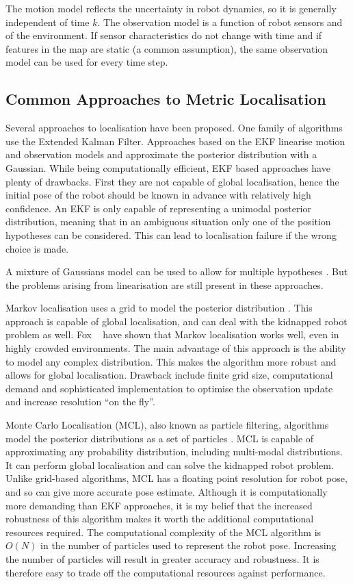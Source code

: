 The motion model reflects the uncertainty in robot dynamics, so it is
generally independent of time $k$. The observation model is a function
of robot sensors and of the environment. If sensor characteristics do
not change with time and if features in the map are static (a common
assumption), the same observation model can be used for every time
step.

\subsection{Common Approaches to Metric Localisation}

Several approaches to localisation have been proposed. One family of
algorithms use the Extended Kalman Filter\cite{Jensfelt99}. Approaches
based on the EKF linearise motion and observation models and
approximate the posterior distribution with a Gaussian. While being
computationally efficient, EKF based approaches have plenty of
drawbacks. First they are not capable of global localisation, hence
the initial pose of the robot should be known in advance with
relatively high confidence. An EKF is only capable of representing a
unimodal posterior distribution, meaning that in an ambiguous
situation only one of the position hypotheses can be considered. This
can lead to localisation failure if the wrong choice is made.

A mixture of Gaussians model can be used to allow for multiple
hypotheses \cite{JensfeltKristensen01,Cox94}. But the problems arising
from linearisation are still present in these approaches.

Markov localisation uses a grid to model the posterior distribution
\cite{Fox99}. This approach is capable of global localisation, and can
deal with the kidnapped robot problem as well. Fox \etal\ \cite{fb99}
have shown that Markov localisation works well, even in highly crowded
environments. The main advantage of this approach is the ability to
model any complex distribution. This makes the algorithm more robust
and allows for global localisation. Drawback include finite grid size,
computational demand and sophisticated implementation to optimise the
observation update and increase resolution ``on the fly''.

Monte Carlo Localisation (MCL), also known as particle filtering,
algorithms model the posterior distributions as a set of particles
\cite{Thrun00j, JensfeltAustinWijk00b}. MCL is capable of
approximating any probability distribution, including multi-modal
distributions. It can perform global localisation and can solve the
kidnapped robot problem. Unlike grid-based algorithms, MCL has a
floating point resolution for robot pose, and so can give more
accurate pose estimate. Although it is computationally more demanding
than EKF approaches, it is my belief that the increased robustness of
this algorithm makes it worth the additional computational resources
required. The computational complexity of the MCL algorithm is $O(N)$
in the number of particles used to represent the robot
pose. Increasing the number of particles will result in greater
accuracy and robustness. It is therefore easy to trade off the
computational resources against performance.

